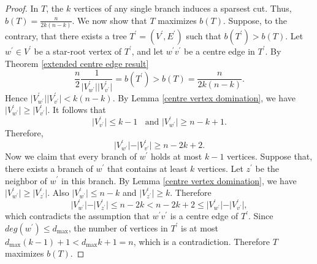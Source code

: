 \documentclass[12pt]{article}
\begin{document}
\begin{proof}



In $T$, the $k$ vertices of any single branch induces a sparsest cut. Thus, $b(T)=\frac{n}{2k(n-k)}$. We now show that $T$ maximizes $b(T)$. Suppose, to the contrary, that there exists a tree  $T^\prime=(V^\prime,E^\prime)$ such that $b(T^\prime)>b(T)$. Let $w^\prime \in V^\prime$ be a star-root vertex of $T^\prime$, and let $w^\prime v^\prime$ be a centre edge in $T^\prime$. By Theorem \ref{extended centre edge result}
$$
 \frac{n}{2}\frac{1}{\vert V^\prime_{w^\prime}\vert \vert V^\prime_{v^\prime}\vert}=b(T^\prime)>b(T)=\frac{n}{2k(n-k)}.
 $$
Hence $\vert V^\prime_{w^\prime}\vert \vert V^\prime_{v^\prime}\vert < k(n-k)$. By Lemma \ref{centre vertex domination}, we have $\vert V^\prime_{w^\prime}\vert \geq \vert V^\prime_{v^\prime}\vert$. It follows that $$\vert V^\prime_{v^\prime}\vert \leq k-1~\mbox{~ and~} \vert V^\prime_{w^\prime} \vert \geq n-k+1.$$ Therefore, $$\vert V^\prime_{w^\prime} \vert - \vert V^\prime_{v^\prime}\vert \geq n-2k+2.$$
Now we claim that every branch of $w^\prime$ holds at most $k-1$ vertices. Suppose that, there exists a branch of $w^\prime$ that contains at least $k$ vertices. Let $z^\prime$ be the neighbor of $w^\prime$ in this branch. By Lemma \ref{centre vertex domination}, we have $\vert V^\prime_{w^\prime}\vert \geq \vert V^\prime_{z^\prime} \vert$. Also  $\vert V^\prime_{w^\prime}\vert \leq n-k$ and $\vert V^\prime_{z^\prime}\vert \geq k$. Therefore $$\vert V^\prime_{w^\prime}\vert-\vert V^\prime_{z^\prime}\vert \leq n-2k <n-2k+2 \leq \vert V^\prime_{w^\prime} \vert - \vert V^\prime_{v^\prime}\vert,$$
which contradicts the assumption that $w^\prime v^\prime$ is a centre edge of $T^\prime$.
Since $deg(w^\prime) \leq d_{\max}$, the number of vertices in $T^\prime$ is at most $d_{\max}(k-1)+1 <d_{\max}k+1=n$, which is a contradiction. Therefore $T$ maximizes $b(T)$.


\end{proof}
\end{document}
